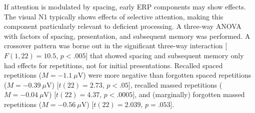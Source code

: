 If attention is modulated by spacing, early ERP components may show effects.  The visual N1 typically shows effects of selective attention, making this component particularly relevant to deficient processing.
A three-way ANOVA with factors of spacing, presentation, and subsequent memory was performed.
A crossover pattern was borne out in the significant three-way interaction [$F(1,22)=10.5$, $p<.005$] that showed spacing and subsequent memory only had effects for repetitions, not for initial presentations.  Recalled spaced repetitions ($M=-1.1~\mu$V) were more negative than forgotten spaced repetitions ($M=-0.39~\mu$V) [$t(22)=2.73$, $p<.05$], recalled massed repetitions ($M=-0.04~\mu$V) [$t(22)=4.37$, $p<.0005$], and (marginally) forgotten massed repetitions ($M=-0.56~\mu$V) [$t(22)=2.039$, $p=.053$].

